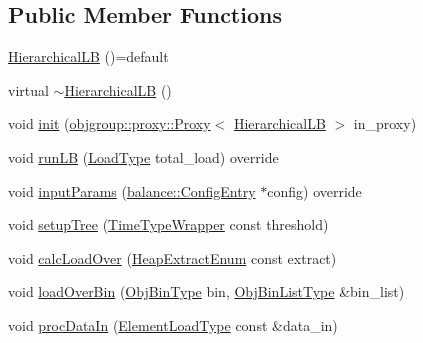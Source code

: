 \subsection*{Public Member Functions}
\begin{DoxyCompactItemize}
\item 
\hyperlink{structvt_1_1vrt_1_1collection_1_1lb_1_1_hierarchical_l_b_ac654b0d8eca15063f5138ec56ebb2bbb}{Hierarchical\+LB} ()=default
\item 
virtual \hyperlink{structvt_1_1vrt_1_1collection_1_1lb_1_1_hierarchical_l_b_aa2b6be5befe22ad9edcf796e9ac91568}{$\sim$\+Hierarchical\+LB} ()
\item 
void \hyperlink{structvt_1_1vrt_1_1collection_1_1lb_1_1_hierarchical_l_b_a3200eb80dca7ad15c7f881dc418f22f7}{init} (\hyperlink{structvt_1_1objgroup_1_1proxy_1_1_proxy}{objgroup\+::proxy\+::\+Proxy}$<$ \hyperlink{structvt_1_1vrt_1_1collection_1_1lb_1_1_hierarchical_l_b}{Hierarchical\+LB} $>$ in\+\_\+proxy)
\item 
void \hyperlink{structvt_1_1vrt_1_1collection_1_1lb_1_1_hierarchical_l_b_a4abe2f02571b4495033e70e75ca67afe}{run\+LB} (\hyperlink{namespacevt_a8fb51741340b87d7aaee0bef60e9896b}{Load\+Type} total\+\_\+load) override
\item 
void \hyperlink{structvt_1_1vrt_1_1collection_1_1lb_1_1_hierarchical_l_b_a2ef293b1f626aa50e4ac4dd7ed12915c}{input\+Params} (\hyperlink{structvt_1_1vrt_1_1collection_1_1balance_1_1_config_entry}{balance\+::\+Config\+Entry} $\ast$config) override
\item 
void \hyperlink{structvt_1_1vrt_1_1collection_1_1lb_1_1_hierarchical_l_b_a585a35b50be78c7ef282466a75d7526c}{setup\+Tree} (\hyperlink{structvt_1_1_time_type_wrapper}{Time\+Type\+Wrapper} const threshold)
\item 
void \hyperlink{structvt_1_1vrt_1_1collection_1_1lb_1_1_hierarchical_l_b_a6fb4de858caf08759fe503b04f4cdded}{calc\+Load\+Over} (\hyperlink{namespacevt_1_1vrt_1_1collection_1_1lb_aeb0f47cf4b89bed7ea05462d0c2e5b5e}{Heap\+Extract\+Enum} const extract)
\item 
void \hyperlink{structvt_1_1vrt_1_1collection_1_1lb_1_1_hierarchical_l_b_a81e03ca1264d0b2cf9b0ee3eef7f792a}{load\+Over\+Bin} (\hyperlink{structvt_1_1vrt_1_1collection_1_1lb_1_1_load_sampler_base_l_b_acb55af31b27a3c248d351189abd78487}{Obj\+Bin\+Type} bin, \hyperlink{structvt_1_1vrt_1_1collection_1_1lb_1_1_load_sampler_base_l_b_a58de8f1e1204cf52b661b3906e2d9eeb}{Obj\+Bin\+List\+Type} \&bin\+\_\+list)
\item 
void \hyperlink{structvt_1_1vrt_1_1collection_1_1lb_1_1_hierarchical_l_b_afcd789adcc57348b7da92801119bd8f1}{proc\+Data\+In} (\hyperlink{structvt_1_1vrt_1_1collection_1_1lb_1_1_base_l_b_adfae019ae1d55a6bf4f080f9b455fca4}{Element\+Load\+Type} const \&data\+\_\+in)
\end{DoxyCompactItemize}
